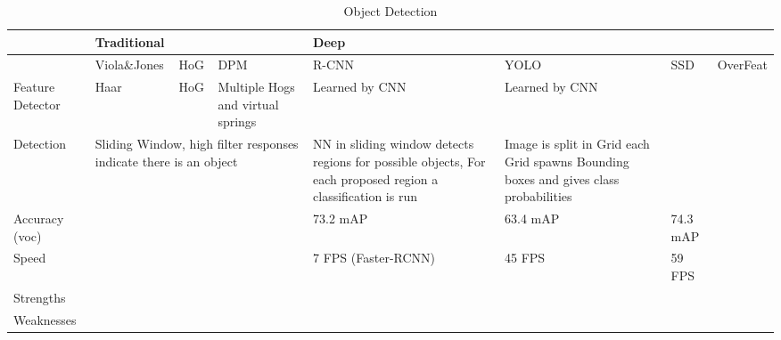 \documentclass{article}
\begin{document}
\begin{landscape}

\begin{table}[]
	
	\caption{Object Detection}
	\label{my-label}
	\begin{tabular}{|p{3cm}|p{3cm}|p{3cm}|p{3cm}|p{3cm}|p{3cm}|p{3cm}|p{3cm}|}
		\hline
		& \multicolumn{3}{l|}{Traditional} & \multicolumn{4}{l|}{Deep}   \\ \hline
		& Viola\&Jones    				   & HoG    & DPM   		   & R-CNN    & YOLO         & SSD & OverFeat \\ \hline
		Feature Detector & Haar					   & HoG    & Multiple Hogs and virtual springs   & Learned by CNN     &  Learned by CNN            & & \\ \hline
		Detection & \multicolumn{3}{l|}{Sliding Window, high filter responses indicate there is an object} & NN in sliding window detects regions for possible objects, For each proposed region a classification is run & Image is split in Grid each Grid spawns Bounding boxes and gives class probabilities & & \\
		\hline
		Accuracy (voc) &  & & & 73.2 mAP & 63.4 mAP & 74.3 mAP & \\ 
		\hline
		Speed & & & & 7 FPS (Faster-RCNN) & 45 FPS & 59 FPS & \\
		\hline
		Strengths & & & & & &  &\\
		\hline
		Weaknesses & & & & & &  &\\
		\hline
		\end{tabular}
		
		\end{table}
		\end{landscape}	
		

\end{document}
